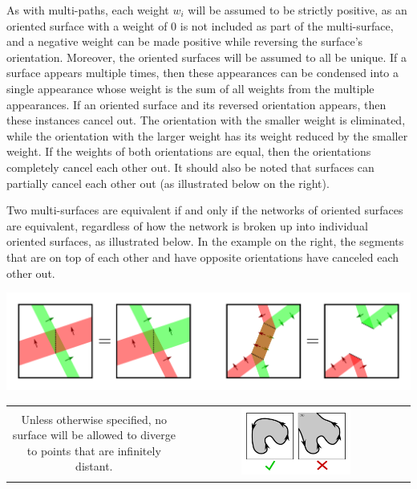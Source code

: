 \documentclass{book}
\begin{document}
As with multi-paths, each weight \(w_i\) will be assumed to be strictly positive, as an oriented surface with a weight of 0 is not included as part of the multi-surface, and a negative weight can be made positive while reversing the surface's orientation. Moreover, the oriented surfaces will be assumed to all be unique. If a surface appears multiple times, then these appearances can be condensed into a single appearance whose weight is the sum of all weights from the multiple appearances. If an oriented surface and its reversed orientation appears, then these instances cancel out. The orientation with the smaller weight is eliminated, while the orientation with the larger weight has its weight reduced by the smaller weight. If the weights of both orientations are equal, then the orientations completely cancel each other out. It should also be noted that surfaces can partially cancel each other out (as illustrated below on the right). 

Two multi-surfaces are equivalent if and only if the networks of oriented surfaces are equivalent, regardless of how the network is broken up into individual oriented surfaces, as illustrated below. In the example on the right, the segments that are on top of each other and have opposite orientations have canceled each other out.     
\begin{center}
\includegraphics[scale = 0.5]{Multi-structures/Multisurfaces/multi-surface_decomposition}
\end{center}

\begin{center}
\begin{tabular}{cc}
\parbox{0.5\textwidth}{
Unless otherwise specified, no surface will be allowed to diverge to points that are infinitely distant.
} & \parbox{0.5\textwidth}{
\includegraphics[width = 0.5\textwidth]{Multi-structures/Multisurfaces/no_infinite_surfaces}
}
\end{tabular}
\end{center}
\end{document}
